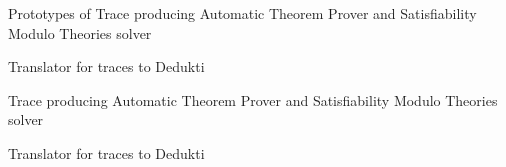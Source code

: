 \begin{workpackage}

\begin{wpdelivs}
  \begin{wpdeliv}[due=6,miles=startup,id=ATPtrace1,dissem=PU,nature=DEM,lead=Inr]
    {Prototypes of Trace producing Automatic Theorem Prover and Satisfiability Modulo Theories solver}
  \end{wpdeliv}

  \begin{wpdeliv}[due=18,miles=startup,id=Trace2Dedukti1,dissem=PU,nature=DEM,lead=Imt]
    {Translator for traces to Dedukti}
  \end{wpdeliv}

  \begin{wpdeliv}[due=48,miles=startup,id=ATPtrace2,dissem=PU,nature=DEM,lead=Inr]
    {Trace producing Automatic Theorem Prover and Satisfiability Modulo Theories solver}
  \end{wpdeliv}

  \begin{wpdeliv}[due=48,miles=startup,id=Trace2Dedukti2,dissem=PU,nature=DEM,lead=Imt]
    {Translator for traces to Dedukti}
  \end{wpdeliv}

\end{wpdelivs}
\end{workpackage}

